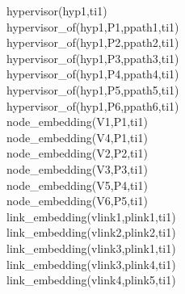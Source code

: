 hypervisor(hyp1,ti1)\\
hypervisor\_of(hyp1,P1,ppath1,ti1)\\
hypervisor\_of(hyp1,P2,ppath2,ti1)\\
hypervisor\_of(hyp1,P3,ppath3,ti1)\\
hypervisor\_of(hyp1,P4,ppath4,ti1)\\
hypervisor\_of(hyp1,P5,ppath5,ti1)\\
hypervisor\_of(hyp1,P6,ppath6,ti1)\\
node\_embedding(V1,P1,ti1)\\
node\_embedding(V4,P1,ti1)\\
node\_embedding(V2,P2,ti1)\\
node\_embedding(V3,P3,ti1)\\
node\_embedding(V5,P4,ti1)\\
node\_embedding(V6,P5,ti1)\\
link\_embedding(vlink1,plink1,ti1)\\
link\_embedding(vlink2,plink2,ti1)\\
link\_embedding(vlink3,plink1,ti1)\\
link\_embedding(vlink3,plink4,ti1)\\
link\_embedding(vlink4,plink5,ti1)
